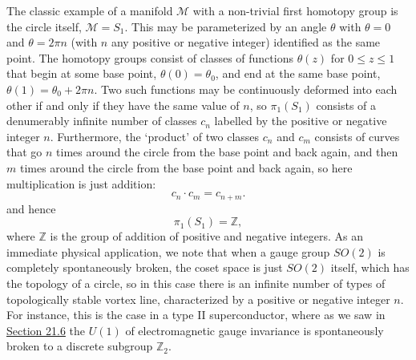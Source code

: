 The classic example of a manifold $\mathcal M$ with a non-trivial first
homotopy group is the circle itself, $\mathcal M=S_1$. This may be
parameterized by an angle $\theta$ with $\theta=0$ and
$\theta=2\pi n$ (with $n$ any positive or negative integer) identified as
the same point. The homotopy groups consist of classes of functions
$\theta(z)$ for $0\leq z\leq1$ that begin at some base point,
$\theta(0)=\theta_0$, and end at the same base point,
$\theta(1)=\theta_0+2\pi n$. Two such functions may be continuously
deformed into each other if and only if they have the same value of $n$,
so $\pi_1(S_1)$ consists of a denumerably infinite number of classes $c_n$
labelled by the positive or negative integer $n$. Furthermore, the
`product' of two classes $c_n$ and $c_m$ consists of curves that go $n$
times around the circle from the base point and back again, and then $m$
times around the circle from the base point and back again, so here
multiplication is just addition:
\begin{equation}
 c_n\cdot c_m=c_{n+m}.
 \tag{23.2.1}\label{eq:23.2.1}
\end{equation}
and hence
\begin{equation}
 \pi_1(S_1)=\mathbb Z,
 \tag{23.2.2}\label{eq:23.2.2}
\end{equation}
where $\mathbb Z$ is the group of addition of positive and negative
integers. As an immediate physical application, we note that when a gauge
group $SO(2)$ is completely spontaneously broken, the coset space is just
$SO(2)$ itself, which has the topology of a circle, so in this case there
is an infinite number of types of topologically stable vortex line,
characterized by a positive or negative integer $n$. For instance, this is
the case in a type II superconductor, where as we saw in
\hyperref[sec:21.6]{Section 21.6} the $U(1)$ of electromagnetic gauge
invariance is spontaneously broken to a discrete subgroup $\mathbb Z_2$.

